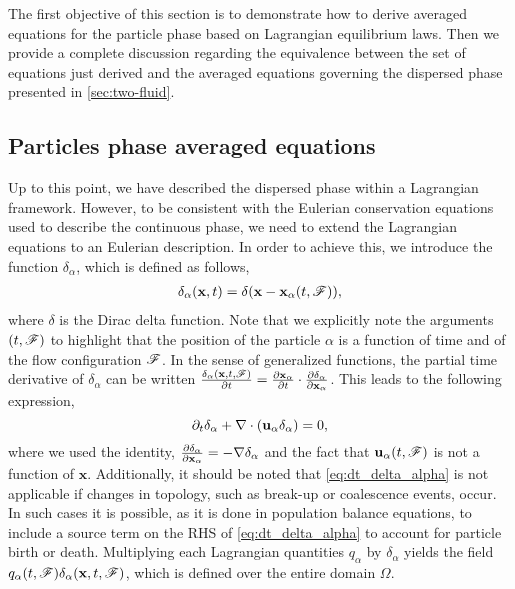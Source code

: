 The first objective of this section is to demonstrate how to derive averaged equations for the particle phase based on Lagrangian equilibrium laws. 
Then we provide a complete discussion regarding the equivalence between the set of equations just derived and the averaged equations governing the dispersed phase presented in \ref{sec:two-fluid}. 

\subsection{Particles phase averaged equations}

Up to this point, we have described the dispersed phase within a Lagrangian framework.
However, to be consistent with the Eulerian conservation equations used to describe the continuous phase, we need to extend the Lagrangian equations to an Eulerian description. 
In order to achieve this, we introduce the function $\delta_\alpha$, which is defined as follows, 
\begin{align}
    \delta_\alpha(\textbf{x},t) = \delta(\textbf{x}-\textbf{x}_\alpha(t,\mathscr{F})),
    \label{eq:delta_alpha}
\end{align}
where $\delta$ is the Dirac delta function.
Note that we explicitly note the arguments $(t,\mathscr{F})$ to highlight that the position of the particle $\alpha$ is a function of time and of the flow configuration $\mathscr{F}$.
In the sense of generalized functions, the partial time derivative of $\delta_\alpha$ can be written $\frac{\delta_\alpha(\textbf{x},t,\mathscr{F})}{\partial t} =  \frac{\partial \textbf{x}_\alpha}{\partial t} \cdot \frac{\partial \delta_\alpha}{\partial \textbf{x}_\alpha} $.
This leads to the following expression, 
\begin{equation}
    \partial_t \delta_\alpha
    + \mathbf{\nabla}\cdot (\textbf{u}_\alpha  \delta_\alpha)
    =0,
    \label{eq:dt_delta_alpha}
\end{equation}
where we used the identity, $\frac{\partial \delta_\alpha}{\partial \textbf{x}_\alpha}  = -\mathbf{\nabla} \delta_\alpha$ and the fact that $\textbf{u}_\alpha(t,\mathscr{F})$ is not a function of $\textbf{x}$. 
Additionally, it should be noted that \ref{eq:dt_delta_alpha} is not applicable if changes in topology, such as break-up or coalescence events, occur.
In such cases it is possible, as it is done in population balance equations, to include a source term on the RHS of \ref{eq:dt_delta_alpha} to account for particle birth or death. 
Multiplying each Lagrangian quantities $q_\alpha$ by $\delta_\alpha$ yields the field $q_\alpha(t,\mathscr{F})\delta_\alpha(\textbf{x},t,\mathscr{F})$, which is defined over the entire domain $\Omega$.
